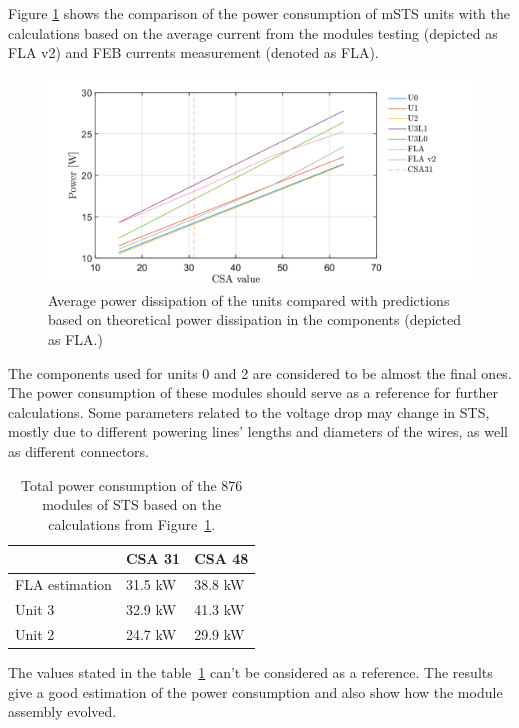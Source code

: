 Figure \ref{fig_theor} shows the comparison of the power consumption of \gls{mSTS} units with the calculations based on the average current from the modules testing (depicted as FLA v2) and FEB currents measurement (denoted as FLA). 

\begin{figure}[h!]
\centering
\includegraphics[width=0.95\columnwidth]{Chapter6/DCS/images/theor.png}
\caption{Average power dissipation of the units compared with predictions based on theoretical power dissipation in the components (depicted as FLA.)} 
\label{fig_theor}
\end{figure}
The components used for units 0 and 2 are considered to be almost the final ones. The power consumption of these modules should serve as a reference for further calculations. Some parameters related to the voltage drop may change in \gls{STS}, mostly due to different powering lines' lengths and diameters of the wires, as well as different connectors. 
\begin{table}[h!]
\caption{Total power consumption of the 876 modules of \gls{STS} based on the calculations from Figure~\ref{fig_theor}.}
\centering
\begin{tabular}{lll}
\hline
               & \gls{CSA} 31  & \gls{CSA} 48  \\ \hline
FLA estimation & 31.5 kW & 38.8 kW \\
Unit 3         & 32.9 kW & 41.3 kW \\
Unit 2         & 24.7 kW & 29.9 kW \\ \hline
\end{tabular}

\label{tab:power_cons}
\end{table}
The values stated in the table~\ref{tab:power_cons} can't be considered as a reference. The results give a good estimation of the power consumption and also show how the module assembly evolved. 
